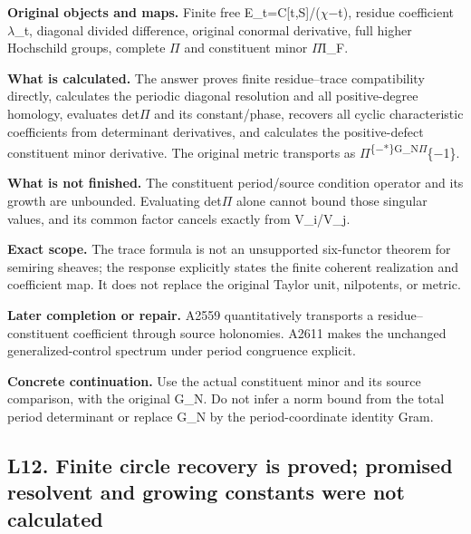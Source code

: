 \textbf{Original objects and maps.} Finite free
E\_t=C[t,S]/(\allowbreak{}\ensuremath{χ}\allowbreak{}\allowbreak{}\ensuremath{−}\allowbreak{}t),
residue coefficient \allowbreak{}\ensuremath{λ}\allowbreak{}\_t,
diagonal divided difference, original conormal derivative, full higher
Hochschild groups, complete \allowbreak{}\ensuremath{Π}\allowbreak{} and
constituent minor \allowbreak{}\ensuremath{Π}\allowbreak{}I\_F.

\textbf{What is calculated.} The answer proves finite residue--trace
compatibility directly, calculates the periodic diagonal resolution and
all positive-degree homology, evaluates
det\allowbreak{}\ensuremath{Π}\allowbreak{} and its constant/phase,
recovers all cyclic characteristic coefficients from determinant
derivatives, and calculates the positive-defect constituent minor
derivative. The original metric transports as
\allowbreak{}\ensuremath{Π}\allowbreak{}\textsuperscript{\{\allowbreak{}\ensuremath{−}\allowbreak{}*\}G\_N\allowbreak{}\ensuremath{Π}\allowbreak{}}\{\allowbreak{}\ensuremath{−}\allowbreak{}1\}.

\textbf{What is not finished.} The constituent period/source condition
operator and its growth are unbounded. Evaluating
det\allowbreak{}\ensuremath{Π}\allowbreak{} alone cannot bound those
singular values, and its common factor cancels exactly from V\_i/V\_j.

\textbf{Exact scope.} The trace formula is not an unsupported
six-functor theorem for semiring sheaves; the response explicitly states
the finite coherent realization and coefficient map. It does not replace
the original Taylor unit, nilpotents, or metric.

\textbf{Later completion or repair.} A2559 quantitatively transports a
residue--constituent coefficient through source holonomies. A2611 makes
the unchanged generalized-control spectrum under period congruence
explicit.

\textbf{Concrete continuation.} Use the actual constituent minor and its
source comparison, with the original G\_N. Do not infer a norm bound
from the total period determinant or replace G\_N by the
period-coordinate identity Gram.

\subsection{L12. Finite circle recovery is proved; promised resolvent
and growing constants were not
calculated}\label{TranscriptLedgerStage:l12.-finite-circle-recovery-is-proved-promised-resolvent-and-growing-constants-were-not-calculated}

